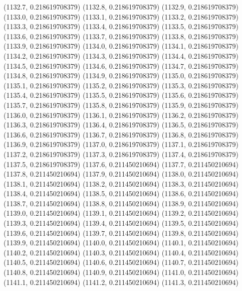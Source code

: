 {					(1132.7, 0.218619708379)
					(1132.8, 0.218619708379)
					(1132.9, 0.218619708379)
					(1133.0, 0.218619708379)
					(1133.1, 0.218619708379)
					(1133.2, 0.218619708379)
					(1133.3, 0.218619708379)
					(1133.4, 0.218619708379)
					(1133.5, 0.218619708379)
					(1133.6, 0.218619708379)
					(1133.7, 0.218619708379)
					(1133.8, 0.218619708379)
					(1133.9, 0.218619708379)
					(1134.0, 0.218619708379)
					(1134.1, 0.218619708379)
					(1134.2, 0.218619708379)
					(1134.3, 0.218619708379)
					(1134.4, 0.218619708379)
					(1134.5, 0.218619708379)
					(1134.6, 0.218619708379)
					(1134.7, 0.218619708379)
					(1134.8, 0.218619708379)
					(1134.9, 0.218619708379)
					(1135.0, 0.218619708379)
					(1135.1, 0.218619708379)
					(1135.2, 0.218619708379)
					(1135.3, 0.218619708379)
					(1135.4, 0.218619708379)
					(1135.5, 0.218619708379)
					(1135.6, 0.218619708379)
					(1135.7, 0.218619708379)
					(1135.8, 0.218619708379)
					(1135.9, 0.218619708379)
					(1136.0, 0.218619708379)
					(1136.1, 0.218619708379)
					(1136.2, 0.218619708379)
					(1136.3, 0.218619708379)
					(1136.4, 0.218619708379)
					(1136.5, 0.218619708379)
					(1136.6, 0.218619708379)
					(1136.7, 0.218619708379)
					(1136.8, 0.218619708379)
					(1136.9, 0.218619708379)
					(1137.0, 0.218619708379)
					(1137.1, 0.218619708379)
					(1137.2, 0.218619708379)
					(1137.3, 0.218619708379)
					(1137.4, 0.218619708379)
					(1137.5, 0.218619708379)
					(1137.6, 0.211450210694)
					(1137.7, 0.211450210694)
					(1137.8, 0.211450210694)
					(1137.9, 0.211450210694)
					(1138.0, 0.211450210694)
					(1138.1, 0.211450210694)
					(1138.2, 0.211450210694)
					(1138.3, 0.211450210694)
					(1138.4, 0.211450210694)
					(1138.5, 0.211450210694)
					(1138.6, 0.211450210694)
					(1138.7, 0.211450210694)
					(1138.8, 0.211450210694)
					(1138.9, 0.211450210694)
					(1139.0, 0.211450210694)
					(1139.1, 0.211450210694)
					(1139.2, 0.211450210694)
					(1139.3, 0.211450210694)
					(1139.4, 0.211450210694)
					(1139.5, 0.211450210694)
					(1139.6, 0.211450210694)
					(1139.7, 0.211450210694)
					(1139.8, 0.211450210694)
					(1139.9, 0.211450210694)
					(1140.0, 0.211450210694)
					(1140.1, 0.211450210694)
					(1140.2, 0.211450210694)
					(1140.3, 0.211450210694)
					(1140.4, 0.211450210694)
					(1140.5, 0.211450210694)
					(1140.6, 0.211450210694)
					(1140.7, 0.211450210694)
					(1140.8, 0.211450210694)
					(1140.9, 0.211450210694)
					(1141.0, 0.211450210694)
					(1141.1, 0.211450210694)
					(1141.2, 0.211450210694)
					(1141.3, 0.211450210694)
}
